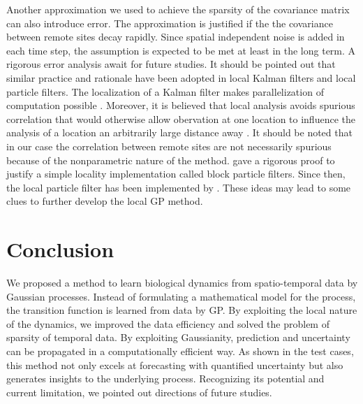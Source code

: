\documentclass[smallextended,natbib]{svjour3}       %
\begin{document}
Another approximation we used to achieve the sparsity of the covariance matrix can also introduce error. The approximation is justified if the the covariance between remote sites decay rapidly. Since spatial independent noise is added in each time step, the assumption is expected to be met at least in the long term. A rigorous error analysis await for future studies. It should be pointed out that similar practice and rationale have been adopted in local Kalman filters and local particle filters. The localization of a Kalman filter makes parallelization of computation possible \citep{ott2004local,Hunt2007,szunyogh2008local}. Moreover, it is believed that local analysis avoids spurious correlation that would otherwise allow obervation at one location to influence the analysis of a  location an arbitrarily large distance away \citep{Hunt2007}. It should be noted that in our case the correlation between remote sites are not necessarily spurious because of the nonparametric nature of the method. \cite{Rebeschini2015} gave a rigorous proof to justify a simple locality implementation called block particle filters. Since then, the local particle filter has been implemented by \cite{morzfeld2018variational,farchi2018comparison}. These ideas may lead to some clues to further develop the local GP method.     


\section{Conclusion}
We proposed a method to learn biological dynamics from spatio-temporal data by Gaussian processes.  Instead of formulating a mathematical model for the process,  the transition function is learned from data by GP. By exploiting the local nature of the dynamics, we improved the data efficiency and solved the problem of sparsity of temporal data. By exploiting Gaussianity, prediction and uncertainty can be propagated in a computationally efficient way. As shown in the test cases, this method not only excels at forecasting with quantified uncertainty but also generates insights to the underlying process. Recognizing its potential and current limitation, we pointed out directions of future studies. 




%
%
\end{document}
